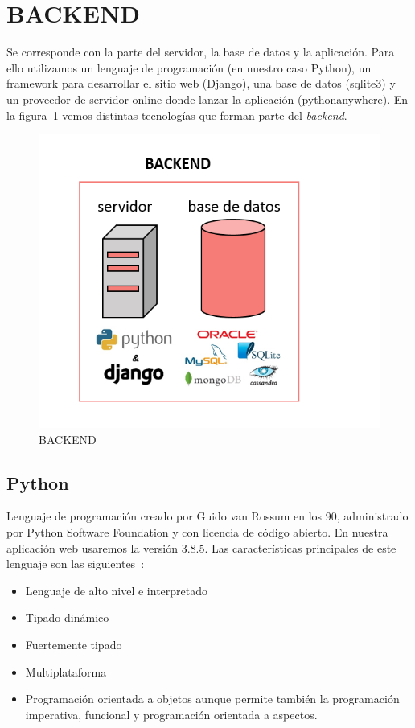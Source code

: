\documentclass[a4paper, 12pt]{book}
\begin{document}
\section{BACKEND}
Se corresponde con la parte del servidor, la base de datos y la aplicación. Para ello utilizamos un lenguaje de programación (en nuestro caso Python), un framework para desarrollar el sitio web (Django), una base de datos (sqlite3) y un proveedor de servidor online donde lanzar la aplicación (pythonanywhere). En la figura~\ref{figura:backend} vemos distintas tecnologías que forman parte del \textit{backend}.
\begin{figure}[h]
        \centering
        \includegraphics[scale=0.6]{img/backend.png}
        \caption{BACKEND}
        \label{figura:backend}
\end{figure}
\subsection{Python}
Lenguaje de programación creado por Guido van Rossum en los 90, administrado por Python Software Foundation y con licencia de código abierto. En nuestra aplicación web usaremos la versión 3.8.5. Las características principales de este lenguaje son las siguientes~\cite{gonzalez2014python}:
\begin{itemize}
    \item Lenguaje de alto nivel e interpretado
    \item Tipado dinámico 
    \item Fuertemente tipado
    \item Multiplataforma
    \item Programación orientada a objetos aunque permite también la programación imperativa, funcional y programación orientada a aspectos.
\end{itemize}
\end{document}
